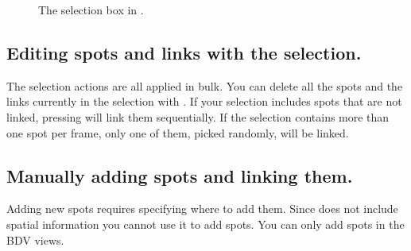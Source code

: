 \begin{figure}
    \centering
    \null\hfill
    \hfill
    \hfill\null
    
    \caption{The selection box in \TrackScheme.}
    \label{fig:SelectionBox}
\end{figure}  



\subsection{Editing spots and links with the selection.}

The selection actions are all applied in bulk. 
You can delete all the spots and the links currently in the selection with \keys{\shift+\backdel}.
If your selection includes spots that are not linked, pressing  will link them sequentially. 
If the selection contains more than one spot per frame, only one of them, picked randomly, will be linked. 



\subsection{Manually adding spots and linking them.}

Adding new spots requires specifying where to add them.
Since \TrackScheme does not include spatial information you cannot use it to add spots.
You can only add spots in the BDV views. 

